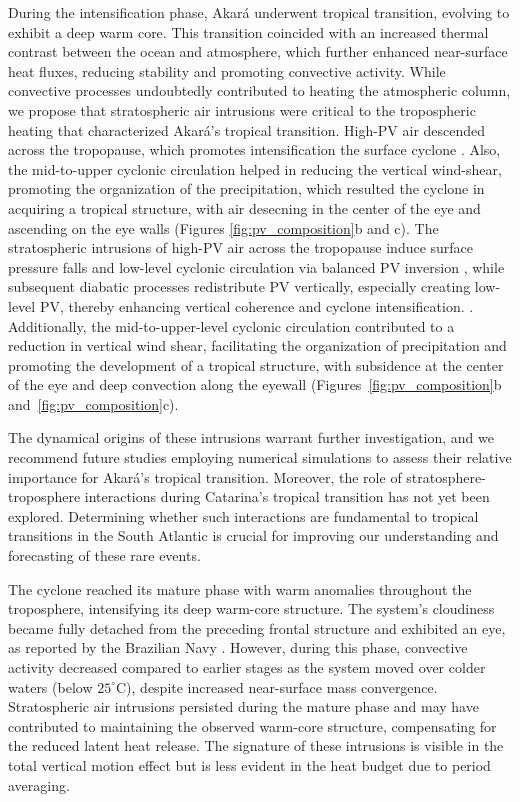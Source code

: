 \documentclass[pdflatex,sn-chicago]{sn-jnl}%
\theoremstyle{plain}
\theoremstyle{definition}
\theoremstyle{remark}
\theoremstyle{definition}
\begin{document}
During the intensification phase, Akará underwent tropical transition, evolving to exhibit a deep warm core. This transition coincided with an increased thermal contrast between the ocean and atmosphere, which further enhanced near-surface heat fluxes, reducing stability and promoting convective activity. While convective processes undoubtedly contributed to heating the atmospheric column, we propose that stratospheric air intrusions were critical to the tropospheric heating that characterized Akará's tropical transition. High-PV air descended across the tropopause, which promotes intensification the surface cyclone \citep{hoskins1985use,hulme2009synoptic,davis2003baroclinically}. Also, the mid-to-upper cyclonic circulation helped in reducing the vertical wind-shear, promoting the organization of the precipitation, which resulted the cyclone in acquiring a tropical structure, with air desecning in the center of the eye and ascending on the eye walls (Figures \ref{fig:pv_composition}b and c). The stratospheric intrusions of high-PV air across the tropopause induce surface pressure falls and low-level cyclonic circulation via balanced PV inversion \citep{hoskins1985use,davis1992piecewise}, while subsequent diabatic processes redistribute PV vertically, especially creating low-level PV, thereby enhancing vertical coherence and cyclone intensification. \citep{Stoelinga1996PV,hulme2009synoptic,hulme2009synoptic2,davis2003baroclinically}. Additionally, the mid-to-upper-level cyclonic circulation contributed to a reduction in vertical wind shear, facilitating the organization of precipitation and promoting the development of a tropical structure, with subsidence at the center of the eye and deep convection along the eyewall (Figures~\ref{fig:pv_composition}b and~\ref{fig:pv_composition}c).

The dynamical origins of these intrusions warrant further investigation, and we recommend future studies employing numerical simulations to assess their relative importance for Akará's tropical transition. Moreover, the role of stratosphere-troposphere interactions during Catarina's tropical transition has not yet been explored. Determining whether such interactions are fundamental to tropical transitions in the South Atlantic is crucial for improving our understanding and forecasting of these rare events.

The cyclone reached its mature phase with warm anomalies throughout the troposphere, intensifying its deep warm-core structure. The system's cloudiness became fully detached from the preceding frontal structure and exhibited an eye, as reported by the Brazilian Navy \citep{marinha2024}. However, during this phase, convective activity decreased compared to earlier stages as the system moved over colder waters (below $25^{\circ}\text{C}$), despite increased near-surface mass convergence. Stratospheric air intrusions persisted during the mature phase and may have contributed to maintaining the observed warm-core structure, compensating for the reduced latent heat release. The signature of these intrusions is visible in the total vertical motion effect but is less evident in the heat budget due to period averaging.
\end{document}
